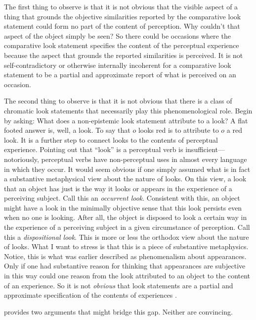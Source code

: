 \documentclass[12pt]{article}
\begin{document}
The first thing to observe is that it is not obvious that the visible aspect of a thing that grounds the objective similarities reported by the comparative look statement could form no part of the content of perception. Why couldn't that aspect of the object simply be seen? So there could be occasions where the comparative look statement specifies the content of the perceptual experience because the aspect that grounds the reported similarities is perceived. It is not self-contradictory or otherwise internally incoherent for a comparative look statement to be a partial and approximate report of what is perceived on an occasion.

The second thing to observe is that it is not obvious that there is a class of chromatic look statements that necessarily play this phenomenological role. Begin by asking: What does a non-epistemic look statement attribute to a look? A flat footed answer is, well, a look. To say that \( o \) looks red is to attribute to \( o \) a red look. It is a further step to connect looks to the contents of perceptual experience. Pointing out that ``look'' is a perceptual verb is insufficient---notoriously, perceptual verbs have non-perceptual uses in almost every language in which they occur. It would seem obvious if one simply assumed what is in fact a substantive metaphysical view about the nature of looks. On this view, a look that an object has just is the way it looks or appears in the experience of a perceiving subject. Call this an \emph{occurrent look}. Consistent with this, an object might have a look in the minimally objective sense that this look persists even when no one is looking. After all, the object is disposed to look a certain way in the experience of a perceiving subject in a given circumstance of perception. Call this a \emph{dispositional look}. This is more or less the orthodox view about the nature of looks. What I want to stress is that this is a piece of substantive metaphysics. Notice, this is what was earlier described as phenomenalism about appearances. Only if one had substantive reason for thinking that appearances are subjective in this way could one reason from the look attributed to an object to the content of an experience. So it is not \emph{obvious} that look statements are a partial and approximate specification of the contents of experiences \citep[for a defense of objective looks see][]{Martin:2008vn,Travis:2004kx}.

\citet{Jackson:1977fk} provides two arguments that might bridge this gap. Neither are convincing. 
\end{document}
